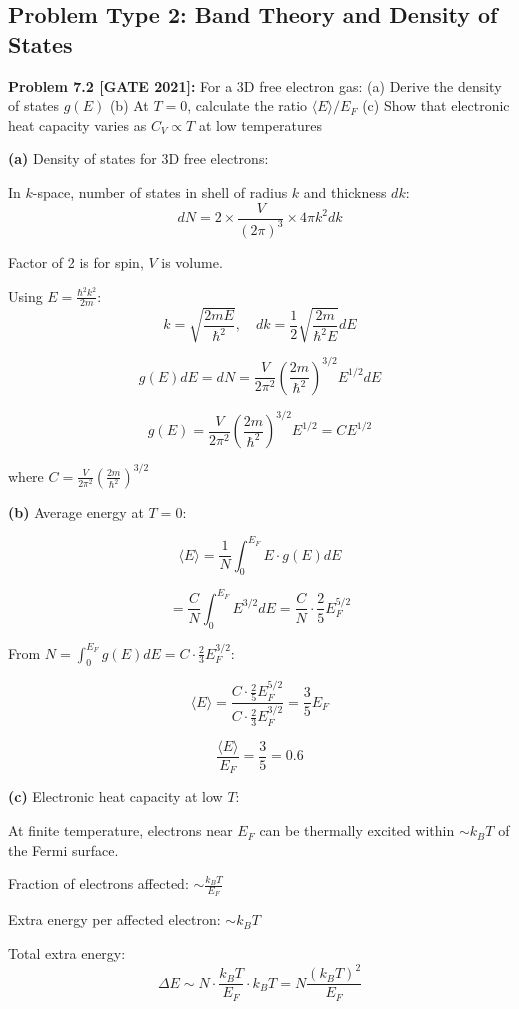 \documentclass[12pt,a4paper]{article}
\begin{document}
\subsection{Problem Type 2: Band Theory and Density of States}

\textbf{Problem 7.2 [GATE 2021]:} For a 3D free electron gas:
(a) Derive the density of states $g(E)$
(b) At $T = 0$, calculate the ratio $\langle E \rangle / E_F$
(c) Show that electronic heat capacity varies as $C_V \propto T$ at low temperatures

\begin{solution}
\textbf{(a)} Density of states for 3D free electrons:

In $k$-space, number of states in shell of radius $k$ and thickness $dk$:
$$dN = 2 \times \frac{V}{(2\pi)^3} \times 4\pi k^2 dk$$

Factor of 2 is for spin, $V$ is volume.

Using $E = \frac{\hbar^2 k^2}{2m}$:
$$k = \sqrt{\frac{2mE}{\hbar^2}}, \quad dk = \frac{1}{2}\sqrt{\frac{2m}{\hbar^2 E}}dE$$

$$g(E)dE = dN = \frac{V}{2\pi^2}\left(\frac{2m}{\hbar^2}\right)^{3/2} E^{1/2}dE$$

$$g(E) = \frac{V}{2\pi^2}\left(\frac{2m}{\hbar^2}\right)^{3/2} E^{1/2} = CE^{1/2}$$

where $C = \frac{V}{2\pi^2}\left(\frac{2m}{\hbar^2}\right)^{3/2}$

\textbf{(b)} Average energy at $T = 0$:

$$\langle E \rangle = \frac{1}{N}\int_0^{E_F} E \cdot g(E)dE$$

$$= \frac{C}{N}\int_0^{E_F} E^{3/2}dE = \frac{C}{N} \cdot \frac{2}{5}E_F^{5/2}$$

From $N = \int_0^{E_F} g(E)dE = C \cdot \frac{2}{3}E_F^{3/2}$:

$$\langle E \rangle = \frac{C \cdot \frac{2}{5}E_F^{5/2}}{C \cdot \frac{2}{3}E_F^{3/2}} = \frac{3}{5}E_F$$

$$\boxed{\frac{\langle E \rangle}{E_F} = \frac{3}{5} = 0.6}$$

\textbf{(c)} Electronic heat capacity at low $T$:

At finite temperature, electrons near $E_F$ can be thermally excited within $\sim k_BT$ of the Fermi surface.

Fraction of electrons affected: $\sim \frac{k_BT}{E_F}$

Extra energy per affected electron: $\sim k_BT$

Total extra energy:
$$\Delta E \sim N \cdot \frac{k_BT}{E_F} \cdot k_BT = N \frac{(k_BT)^2}{E_F}$$


\end{solution}
\end{document}
